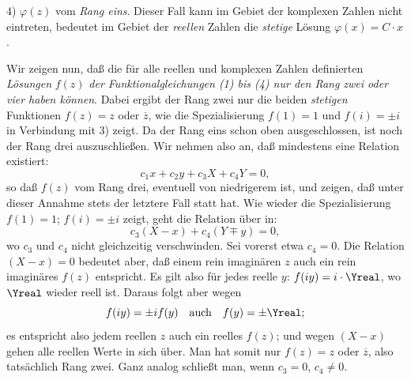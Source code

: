 \documentclass[11pt]{article}
\begin{document}
4) \(\varphi(z)\) vom \emph{Rang eins}. Dieser Fall kann im Gebiet der komplexen Zahlen nicht eintreten, bedeutet im Gebiet der \emph{reellen} Zahlen die \emph{stetige} Lösung \(\varphi(x)=C\cdot x\).

Wir zeigen nun, daß die für alle reellen und komplexen Zahlen definierten \emph{Lösungen} \(f(z)\) \emph{der Funktionalgleichungen (1) bis (4) nur den Rang zwei oder vier haben können}. Dabei ergibt der Rang zwei nur die beiden \emph{stetigen} Funktionen \(f(z)=z\) oder \(\overline z\), wie die Spezialisierung \(f(1)=1\) und \(f(i)=\pm i\) in Verbindung mit 3) zeigt. Da der Rang eins schon oben ausgeschlossen, ist noch der Rang drei auszuschließen. Wir nehmen also an, daß mindestens eine Relation existiert:
\[
c_1x+c_2y+c_3X+c_4Y=0,
\]
so daß \(f(z)\) vom Rang drei, eventuell von niedrigerem ist, und zeigen, daß unter dieser Annahme stets der letztere Fall statt hat. Wie wieder die Spezialisierung \(f(1)=1\); \(f(i)=\pm i\) zeigt, geht die Relation über in:
\[
c_3(X-x)+c_4(Y\mp y)=0,
\]
wo \(c_3\) und \(c_4\) nicht gleichzeitig verschwinden. Sei vorerst etwa \(c_4=0\). Die Relation \((X-x)=0\) bedeutet aber, daß einem rein imaginären \(z\) auch ein rein imaginäres \(f(z)\) entspricht. Es gilt also für jedes reelle \(y\): \(f(iy)=i\cdot\Yreal\), wo \(\Yreal\) wieder reell ist. Daraus folgt aber wegen
\[
f(iy)=\pm i f(y)\quad\text{auch}\quad f(y)=\pm\Yreal;
\]
es entspricht also jedem reellen \(z\) auch ein reelles \(f(z)\); und wegen \((X-x)\) gehen alle reellen Werte in sich über. Man hat somit nur \(f(z)=z\) oder \(\overline z\), also tatsächlich Rang zwei. Ganz analog schließt man, wenn \(c_3=0\), \(c_4\ne0\).
\end{document}
